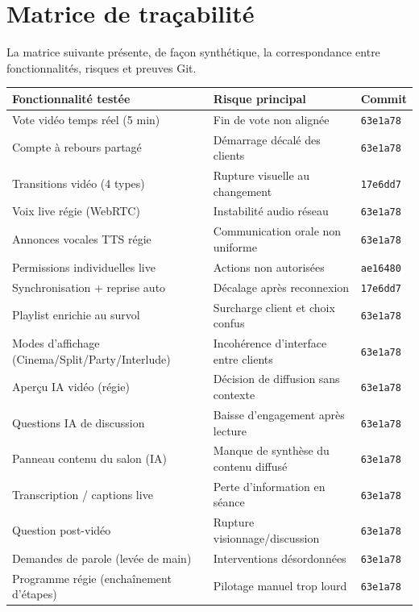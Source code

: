 \documentclass[11pt,a4paper]{report}
\begin{document}
\section{Matrice de traçabilité}
La matrice suivante présente, de façon synthétique, la correspondance entre fonctionnalités, risques et preuves Git.

\small
{}
\begin{longtable}{L{0.36\textwidth} L{0.34\textwidth} C{0.20\textwidth}}
\toprule
{}
\textbf{Fonctionnalité testée} & \textbf{Risque principal} & \textbf{Commit} \\
\midrule
Vote vidéo temps réel (5 min) & Fin de vote non alignée & \texttt{63e1a78} \\
Compte à rebours partagé & Démarrage décalé des clients & \texttt{63e1a78} \\
Transitions vidéo (4 types) & Rupture visuelle au changement & \texttt{17e6dd7} \\
Voix live régie (WebRTC) & Instabilité audio réseau & \texttt{63e1a78} \\
Annonces vocales TTS régie & Communication orale non uniforme & \texttt{63e1a78} \\
Permissions individuelles live & Actions non autorisées & \texttt{ae16480} \\
Synchronisation + reprise auto & Décalage après reconnexion & \texttt{17e6dd7} \\
Playlist enrichie au survol & Surcharge client et choix confus & \texttt{63e1a78} \\
Modes d'affichage (Cinema/Split/Party/Interlude) & Incohérence d'interface entre clients & \texttt{63e1a78} \\
Aperçu IA vidéo (régie) & Décision de diffusion sans contexte & \texttt{63e1a78} \\
Questions IA de discussion & Baisse d'engagement après lecture & \texttt{63e1a78} \\
Panneau contenu du salon (IA) & Manque de synthèse du contenu diffusé & \texttt{63e1a78} \\
Transcription / captions live & Perte d'information en séance & \texttt{63e1a78} \\
Question post-vidéo & Rupture visionnage/discussion & \texttt{63e1a78} \\
Demandes de parole (levée de main) & Interventions désordonnées & \texttt{63e1a78} \\
Programme régie (enchaînement d'étapes) & Pilotage manuel trop lourd & \texttt{63e1a78} \\

\end{longtable}
\end{document}
